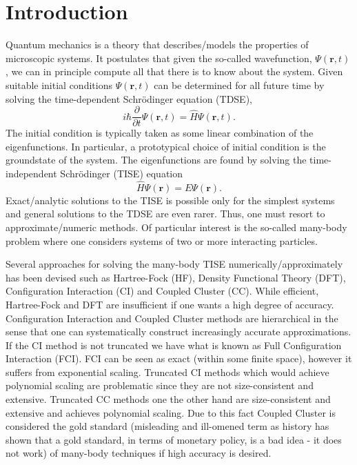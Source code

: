 \documentclass[aip,jcp,reprint,floatfix]{revtex4-1}
\begin{document}
\section{Introduction}
Quantum mechanics is a theory that describes/models the properties of microscopic systems. It postulates that given the so-called wavefunction,
$\Psi(\mathbf{r},t)$, we can in principle compute all that there is to know about the system.  Given suitable initial conditions $\Psi(\mathbf{r},t)$ can be determined for all future time
by solving the time-dependent Schrödinger equation (TDSE),
\begin{equation}
\label{TDSE}
 i \hbar \frac{\partial }{\partial t} \Psi(\mathbf{r},t) = \hat{H} \Psi(\mathbf{r},t).
\end{equation}
The initial condition is typically taken as some linear combination of the eigenfunctions. In particular, a prototypical choice of initial condition is the groundstate of the system. The eigenfunctions are found by solving the time-independent Schrödinger (TISE) equation
\begin{equation}
 \hat{H} \Psi(\mathbf{r}) = E \Psi(\mathbf{r}).
\end{equation}
Exact/analytic solutions to the TISE is possible only for the
simplest systems and general solutions to the TDSE are even
rarer. Thus, one must resort to approximate/numeric methods. Of
particular interest is the so-called many-body problem where one
considers systems of two or more interacting particles.

Several approaches for solving the many-body TISE
numerically/approximately has been devised such as Hartree-Fock
(HF), Density Functional Theory (DFT), Configuration Interaction (CI)
and Coupled Cluster (CC). While efficient, Hartree-Fock and DFT are
insufficient if one wants a high degree of accuracy. Configuration
Interaction and Coupled Cluster methods are hierarchical in the sense
that one can systematically construct increasingly accurate
approximations. If the CI method is not truncated we have what is
known as Full Configuration Interaction (FCI). FCI can be seen as
exact (within some finite space), however it suffers from exponential
scaling. Truncated CI methods which would achieve polynomial scaling
are problematic since they are not size-consistent and
extensive. Truncated CC methods one the other hand are size-consistent
and extensive and achieves polynomial scaling. Due to this fact
Coupled Cluster is considered the gold standard (misleading and ill-omened term as history has shown that a gold standard, in terms of monetary policy, is a bad idea - it does not work) of many-body techniques if high accuracy is desired. 
\end{document}
